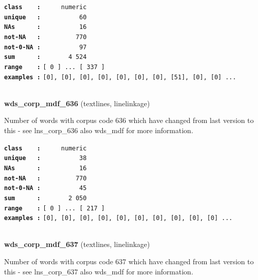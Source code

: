 \documentclass[]{article}
\begin{document}
\textbf{\texttt{class\ \ \ \ :}} \texttt{~~~~~numeric}\\
\textbf{\texttt{unique\ \ \ :}} \texttt{~~~~~~~~~~60}\\
\textbf{\texttt{NAs\ \ \ \ \ \ :}} \texttt{~~~~~~~~~~16}\\
\textbf{\texttt{not-NA\ \ \ :}} \texttt{~~~~~~~~~770}\\
\textbf{\texttt{not-0-NA\ :}} \texttt{~~~~~~~~~~97}\\
\textbf{\texttt{sum\ \ \ \ \ \ :}} \texttt{~~~~~~~4~524}\\
\textbf{\texttt{range\ \ \ \ :}}
\texttt{{[}\ 0\ {]}\ ...\ {[}\ 337\ {]}}\\
\textbf{\texttt{examples\ :}}
\texttt{{[}0{]},\ {[}0{]},\ {[}0{]},\ {[}0{]},\ {[}0{]},\ {[}0{]},\ {[}0{]},\ {[}51{]},\ {[}0{]},\ {[}0{]}\ ...}\\

~

\textbf{wds\_corp\_mdf\_636} (textlines, linelinkage)

Number of words with corpus code 636 which have changed from last
version to this - see lns\_corp\_636 also wds\_mdf for more information.

\textbf{\texttt{class\ \ \ \ :}} \texttt{~~~~~numeric}\\
\textbf{\texttt{unique\ \ \ :}} \texttt{~~~~~~~~~~38}\\
\textbf{\texttt{NAs\ \ \ \ \ \ :}} \texttt{~~~~~~~~~~16}\\
\textbf{\texttt{not-NA\ \ \ :}} \texttt{~~~~~~~~~770}\\
\textbf{\texttt{not-0-NA\ :}} \texttt{~~~~~~~~~~45}\\
\textbf{\texttt{sum\ \ \ \ \ \ :}} \texttt{~~~~~~~2~050}\\
\textbf{\texttt{range\ \ \ \ :}}
\texttt{{[}\ 0\ {]}\ ...\ {[}\ 217\ {]}}\\
\textbf{\texttt{examples\ :}}
\texttt{{[}0{]},\ {[}0{]},\ {[}0{]},\ {[}0{]},\ {[}0{]},\ {[}0{]},\ {[}0{]},\ {[}0{]},\ {[}0{]},\ {[}0{]}\ ...}\\

~

\textbf{wds\_corp\_mdf\_637} (textlines, linelinkage)

Number of words with corpus code 637 which have changed from last
version to this - see lns\_corp\_637 also wds\_mdf for more information.
\end{document}
